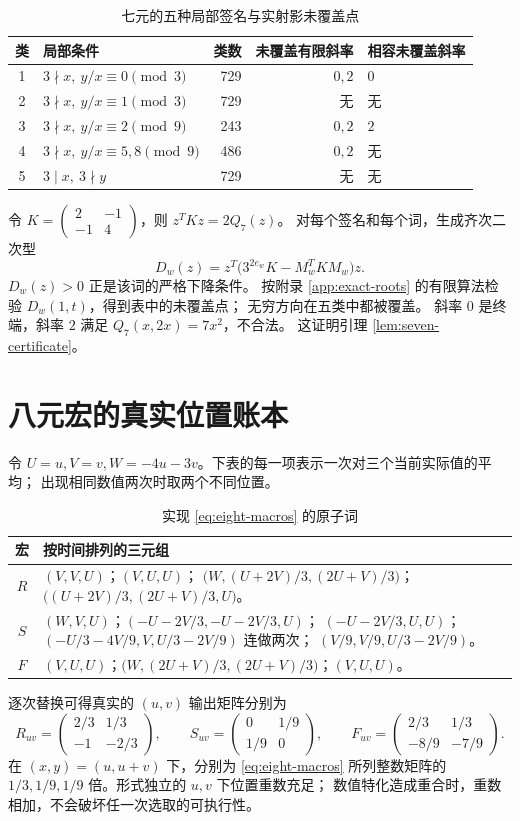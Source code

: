 \documentclass[UTF8,fontset=fandol,zihao=-4,a4paper]{ctexart}
\numberwithin{equation}{section}
\theoremstyle{definition}
\newcommand{\mat}[4]{\begin{pmatrix}#1&#2\\#3&#4\end{pmatrix}}
\begin{document}
\begin{table}[htbp]
\centering\small
\caption{七元的五种局部签名与实射影未覆盖点}\label{tab:seven-types}
\begin{tabular}{clrrl}
\toprule
类 & 局部条件 & 类数 & 未覆盖有限斜率 & 相容未覆盖斜率\\
\midrule
1 & $3\nmid x,\ y/x\equiv0\pmod3$ &729& $0,2$ & $0$\\
2 & $3\nmid x,\ y/x\equiv1\pmod3$ &729& 无 & 无\\
3 & $3\nmid x,\ y/x\equiv2\pmod9$ &243& $0,2$ & $2$\\
4 & $3\nmid x,\ y/x\equiv5,8\pmod9$ &486& $0,2$ & 无\\
5 & $3\mid x,\ 3\nmid y$ &729& 无 & 无\\
\bottomrule
\end{tabular}
\end{table}

令 $K=\mat{2}{-1}{-1}{4}$，则 $z^TKz=2Q_7(z)$。
对每个签名和每个词，生成齐次二次型
\begin{equation}\label{eq:seven-D}
 D_w(z)=z^T\bigl(3^{2e_w}K-M_w^TKM_w\bigr)z.
\end{equation}
$D_w(z)>0$ 正是该词的严格下降条件。
按附录 \ref{app:exact-roots} 的有限算法检验 $D_w(1,t)$，得到表中的未覆盖点；
无穷方向在五类中都被覆盖。
斜率 $0$ 是终端，斜率 $2$ 满足 $Q_7(x,2x)=7x^2$，不合法。
这证明引理 \ref{lem:seven-certificate}。

\section{八元宏的真实位置账本}\label{app:eight}

令 $U=u,V=v,W=-4u-3v$。下表的每一项表示一次对三个当前实际值的平均；
出现相同数值两次时取两个不同位置。
\begin{table}[htbp]
\centering
\caption{实现 \eqref{eq:eight-macros} 的原子词}\label{tab:eight-words}
\begin{tabular}{c>{\raggedright\arraybackslash}p{}}
\toprule 宏 & 按时间排列的三元组\\\midrule
$R$ & $(V,V,U)$；$(V,U,U)$；
$\bigl(W,(U+2V)/3,(2U+V)/3\bigr)$；
$\bigl((U+2V)/3,(2U+V)/3,U\bigr)$。\\[0.6em]
$S$ & $(W,V,U)$；$(-U-2V/3,-U-2V/3,U)$；
$(-U-2V/3,U,U)$；
$(-U/3-4V/9,V,U/3-2V/9)$ 连做两次；
$(V/9,V/9,U/3-2V/9)$。\\[0.6em]
$F$ & $(V,U,U)$；$\bigl(W,(2U+V)/3,(2U+V)/3\bigr)$；$(V,U,U)$。\\
\bottomrule
\end{tabular}
\end{table}
逐次替换可得真实的 $(u,v)$ 输出矩阵分别为
\[
 R_{uv}=\mat{2/3}{1/3}{-1}{-2/3},\qquad
 S_{uv}=\mat{0}{1/9}{1/9}{0},\qquad
 F_{uv}=\mat{2/3}{1/3}{-8/9}{-7/9}.
\]
在 $(x,y)=(u,u+v)$ 下，分别为 \eqref{eq:eight-macros} 所列整数矩阵的
$1/3,1/9,1/9$ 倍。形式独立的 $u,v$ 下位置重数充足；
数值特化造成重合时，重数相加，不会破坏任一次选取的可执行性。
\end{document}
